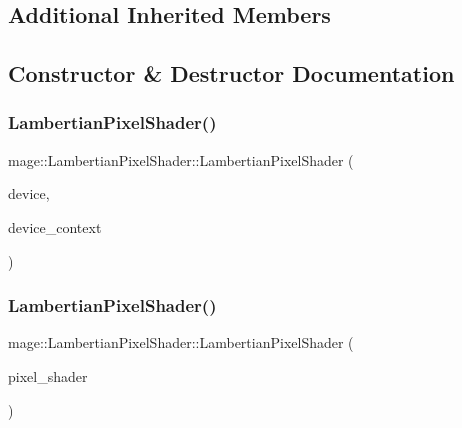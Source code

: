 \subsection*{Additional Inherited Members}


\subsection{Constructor \& Destructor Documentation}
\hypertarget{classmage_1_1_lambertian_pixel_shader_a5f16778caf62403d148bf5edee042935}{}\label{classmage_1_1_lambertian_pixel_shader_a5f16778caf62403d148bf5edee042935} 
\subsubsection{\texorpdfstring{Lambertian\+Pixel\+Shader()}{LambertianPixelShader()}\hspace{0.1cm}{\footnotesize\ttfamily [1/3]}}
{\footnotesize\ttfamily mage\+::\+Lambertian\+Pixel\+Shader\+::\+Lambertian\+Pixel\+Shader (\begin{DoxyParamCaption}\item[{I\+D3\+D11\+Device2 $\ast$}]{device,  }\item[{I\+D3\+D11\+Device\+Context2 $\ast$}]{device\+\_\+context }\end{DoxyParamCaption})\hspace{0.3cm}{\ttfamily [explicit]}}

\hypertarget{classmage_1_1_lambertian_pixel_shader_a0e7a36645bb7e1fa9bd481575886ddad}{}\label{classmage_1_1_lambertian_pixel_shader_a0e7a36645bb7e1fa9bd481575886ddad} 
\subsubsection{\texorpdfstring{Lambertian\+Pixel\+Shader()}{LambertianPixelShader()}\hspace{0.1cm}{\footnotesize\ttfamily [2/3]}}
{\footnotesize\ttfamily mage\+::\+Lambertian\+Pixel\+Shader\+::\+Lambertian\+Pixel\+Shader (\begin{DoxyParamCaption}\item[{const \hyperlink{classmage_1_1_lambertian_pixel_shader}{Lambertian\+Pixel\+Shader} \&}]{pixel\+\_\+shader }\end{DoxyParamCaption})\hspace{0.3cm}{\ttfamily [delete]}}

